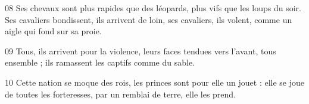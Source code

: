 
08 Ses chevaux sont plus rapides que des léopards, plus vifs que les loups du soir. Ses cavaliers bondissent, ils arrivent de loin, ses cavaliers, ils volent, comme un aigle qui fond sur sa proie.

09 Tous, ils arrivent pour la violence, leurs faces tendues vers l’avant, tous ensemble ; ils ramassent les captifs comme du sable.

10 Cette nation se moque des rois, les princes sont pour elle un jouet : elle se joue de toutes les forteresses, par un remblai de terre, elle les prend.